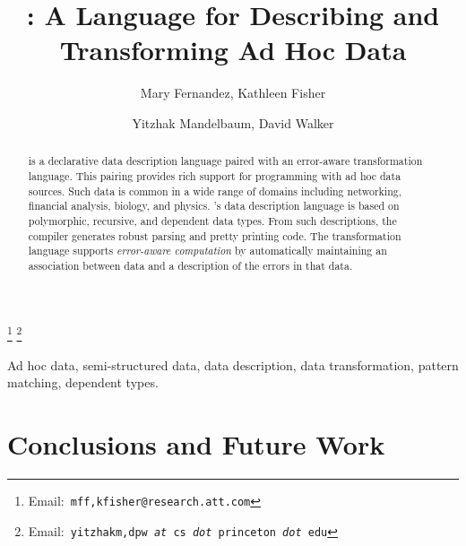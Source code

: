 \documentclass{entcs}
\begin{document}
\begin{frontmatter}
  \title{\datatype{}: A Language for Describing and Transforming Ad Hoc Data} 
  \author{Mary Fernandez,
    Kathleen Fisher}
  \address{AT\&T\\ 
    Florham Park,NJ USA} 
  \author{Yitzhak Mandelbaum,
    David Walker}
  \address{Department of Computer Science\\ 
    Princeton University\\
    Princeton,NJ USA} 
  \thanks[attemail]{Email:\texttt{\normalshape
        mff,kfisher@research.att.com}}
  \thanks[premail]{Email:\texttt{\normalshape
        yitzhakm,dpw {\it at} cs {\it dot} princeton {\it dot} edu}}
\begin{abstract}
\datatype{} is a declarative data description language paired with an 
error-aware transformation language.  This pairing provides rich support for
programming with ad hoc data sources.  Such data is common in a wide range of domains including networking, financial analysis, biology, and physics.
\datatype{}'s data description language is based on polymorphic, recursive, and dependent data types.  From such descriptions, the compiler generates robust parsing and pretty printing code. The transformation language supports \textit{error-aware computation} by automatically maintaining an association between data and a description of the errors in that data.  
\end{abstract}
\begin{keyword}
Ad hoc data, semi-structured data, data description, data transformation, pattern matching, dependent types.
\end{keyword}
\end{frontmatter}











\section{Conclusions and Future Work}
\label{sec:conclusion}



\end{document}
